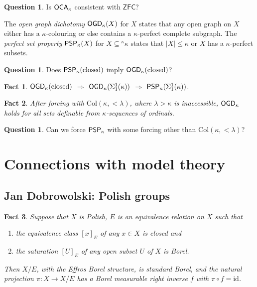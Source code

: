 \documentclass{amsart}
\newtheorem*{fact*}{Fact}
\theoremstyle{definition}
\newtheorem{question}[theorem]{Question}
\newcommand{\ZFC}{\mathsf{ZFC}}
\newcommand{\Col}{\mathrm{Col}}
\begin{document}
\begin{question} 
Is $\mathsf{OCA}_\kappa$ consistent with $\ZFC$? 
\end{question} 

The \emph{open graph dichotomy} $\mathsf{OGD}_\kappa(X)$ for $X$ states that any open graph on $X$ either has a $\kappa$-colouring or else contains a $\kappa$-perfect complete subgraph. 
The \emph{perfect set property} $\mathsf{PSP}_\kappa(X)$ for $X\subseteq {}^\kappa\kappa$ states that $|X|\leq\kappa$ or $X$ has a $\kappa$-perfect subsets. 

\begin{question} 
Does $\mathsf{PSP}_\kappa(\mathrm{closed})$ imply $\mathsf{OGD}_\kappa(\mathrm{closed})$? 
\end{question} 

\begin{fact*} 
$\mathsf{OGD}_\kappa(\mathrm{closed})$ $\Rightarrow$ $\mathsf{OGD}_\kappa(\Sigma^1_1(\kappa))$ $\Rightarrow$ $\mathsf{PSP}_\kappa(\Sigma^1_1(\kappa))$. 
\end{fact*} 

\begin{fact*} 
After forcing with $\Col(\kappa,{<}\lambda)$, where $\lambda>\kappa$ is inaccessible, $\mathsf{OGD}_\kappa$ holds for all sets definable from $\kappa$-sequences of ordinals. 
\end{fact*} 

\begin{question} 
Can we force $\mathsf{PSP}_\kappa$ with some forcing other than $\Col(\kappa,{<}\lambda)$? 
\end{question} 




\section{Connections with model theory} 

\subsection{Jan Dobrowolski: Polish groups} 

\newcommand{\id}{\mathrm{id}} 

\begin{fact*} 
Suppose that $X$ is Polish, $E$ is an equivalence relation on $X$ such that
\begin{enumerate}
\item 
the equivalence class $[x]_E$ of any $x\in X$ is closed and 
\item 
the saturation $[U]_E$ of any open subset $U$ of $X$ is Borel. 
\end{enumerate} 
Then $X/E$, with the Effros Borel structure, is standard Borel, and the natural projection $\pi\colon X\rightarrow X/E$ has a Borel measurable right inverse $f$ with $\pi\circ f=\id$. 
\end{fact*} 
\end{document}
